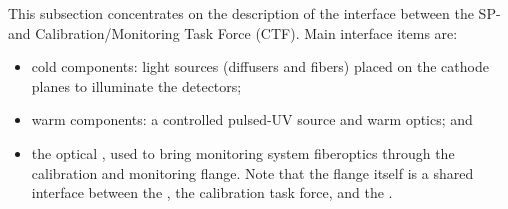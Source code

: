 This subsection concentrates on the description of the interface between the SP- and Calibration/Monitoring Task Force (CTF).
 Main interface items are:
\begin{itemize}
    \item cold components: light sources (diffusers and fibers) placed on the cathode planes to illuminate the detectors;
    \item warm components: a controlled pulsed-UV source and warm optics; and 
    \item the optical \fdth, used to  bring monitoring system fiberoptics through the calibration and monitoring flange.  Note that the flange itself is a shared interface between the , the calibration task force, and the .
\end{itemize}






